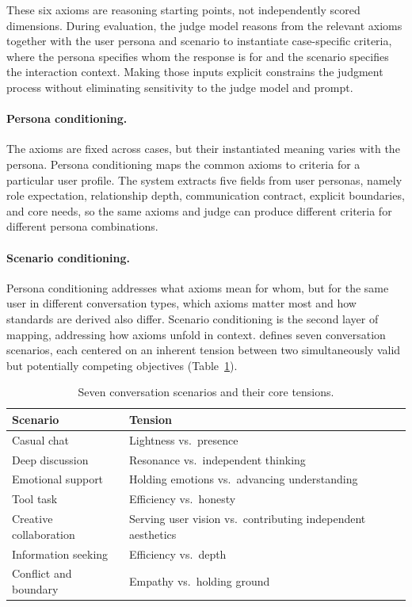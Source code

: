 These six axioms are reasoning starting points, not independently scored dimensions. During evaluation, the judge model reasons from the relevant axioms together with the user persona and scenario to instantiate case-specific criteria, where the persona specifies whom the response is for and the scenario specifies the interaction context. Making those inputs explicit constrains the judgment process without eliminating sensitivity to the judge model and prompt.

\paragraph{Persona conditioning.}
\label{sec:chatbench_persona}
The axioms are fixed across cases, but their instantiated meaning varies with the persona. Persona conditioning maps the common axioms to criteria for a particular user profile. The system extracts five fields from user personas, namely role expectation, relationship depth, communication contract, explicit boundaries, and core needs, so the same axioms and judge can produce different criteria for different persona combinations.

\paragraph{Scenario conditioning.}
\label{sec:chatbench_scenario}
Persona conditioning addresses what axioms mean for whom, but for the same user in different conversation types, which axioms matter most and how standards are derived also differ. Scenario conditioning is the second layer of mapping, addressing how axioms unfold in context. \chatbench{} defines seven conversation scenarios, each centered on an inherent tension between two simultaneously valid but potentially competing objectives (Table~\ref{tab:scenarios}).

\begin{table}[ht]
\centering
\caption{Seven conversation scenarios and their core tensions.}
\label{tab:scenarios}
\begin{tabular}{@{}ll@{}}
\toprule
\textbf{Scenario} & \textbf{Tension} \\
\midrule
Casual chat & Lightness vs.\ presence \\
Deep discussion & Resonance vs.\ independent thinking \\
Emotional support & Holding emotions vs.\ advancing understanding \\
Tool task & Efficiency vs.\ honesty \\
Creative collaboration & Serving user vision vs.\ contributing independent aesthetics \\
Information seeking & Efficiency vs.\ depth \\
Conflict and boundary & Empathy vs.\ holding ground \\
\bottomrule
\end{tabular}
\end{table}

